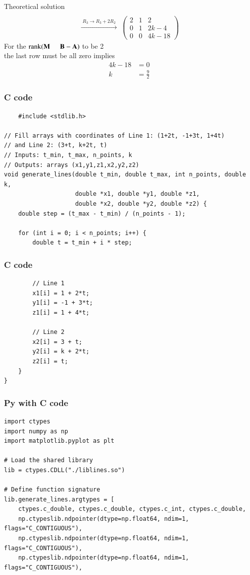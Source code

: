 \documentclass{beamer}
\begin{document}
\begin{frame}{Theoretical solution}
\begin{align}
\;\\\xrightarrow[\;]{\;R_3 \to R_3 + 2R_2\;}\;
\begin{pmatrix}
2 &1 & 2\\
0 & 1 & 2k-4\\
0 & 0 & 4k-18
\end{pmatrix}
\end{align}
For the $\operatorname{rank}(\vec{M} \hspace{5mm}  \vec{B-A})$ to be 2\\
the last row must be all zero implies\\
\begin{align}
4k-18&=0\\
k&=\tfrac{9}{2}
\end{align}
\end{frame}
\begin{frame}[fragile]
    \frametitle{C code}
    \begin{lstlisting}
    #include <stdlib.h>

// Fill arrays with coordinates of Line 1: (1+2t, -1+3t, 1+4t)
// and Line 2: (3+t, k+2t, t)
// Inputs: t_min, t_max, n_points, k
// Outputs: arrays (x1,y1,z1,x2,y2,z2)
void generate_lines(double t_min, double t_max, int n_points, double k,
                    double *x1, double *y1, double *z1,
                    double *x2, double *y2, double *z2) {
    double step = (t_max - t_min) / (n_points - 1);

    for (int i = 0; i < n_points; i++) {
        double t = t_min + i * step;
        \end{lstlisting}
\end{frame}
\begin{frame}[fragile]
    \frametitle{C code}
    \begin{lstlisting}
        // Line 1
        x1[i] = 1 + 2*t;
        y1[i] = -1 + 3*t;
        z1[i] = 1 + 4*t;

        // Line 2
        x2[i] = 3 + t;
        y2[i] = k + 2*t;
        z2[i] = t;
    }
}
 \end{lstlisting}
\end{frame}
\begin{frame}[fragile]
    \frametitle{Py with C code}
    \begin{lstlisting}
import ctypes
import numpy as np
import matplotlib.pyplot as plt

# Load the shared library
lib = ctypes.CDLL("./liblines.so")

# Define function signature
lib.generate_lines.argtypes = [
    ctypes.c_double, ctypes.c_double, ctypes.c_int, ctypes.c_double,
    np.ctypeslib.ndpointer(dtype=np.float64, ndim=1, flags="C_CONTIGUOUS"),
    np.ctypeslib.ndpointer(dtype=np.float64, ndim=1, flags="C_CONTIGUOUS"),
    np.ctypeslib.ndpointer(dtype=np.float64, ndim=1, flags="C_CONTIGUOUS"),
     \end{lstlisting}
\end{frame}
\end{document}
